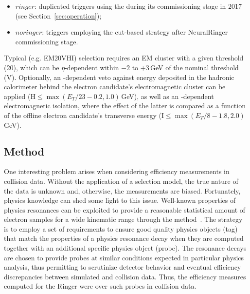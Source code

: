 \begin{itemize}
\item $ringer$: duplicated triggers using the \rnn during its
  commissioning stage in 2017 (see Section~\ref{sec:operation});
\item $noringer$: triggers employing the cut-based strategy after NeuralRinger
  commissioning stage.
\end{itemize}


Typical \licalo (e.g. EM20VHI) selection requires an EM cluster with a
given threshold (20), which can be  $\eta$-dependent within $-2$ to $+3\,$GeV
of the nominal threshold (V). Optionally, an \et-dependent veto against energy
deposited in the hadronic calorimeter behind the electron candidate's
electromagnetic cluster can be applied (H$\le \max(E_T/23-0.2, 1.0)\,$GeV), as
well as an \et-dependent electromagnetic isolation, where the effect of the
latter is compared as a function of the offline electron candidate's transverse
energy (I$\le \max(E_T/8-1.8, 2.0)\,$GeV).



\subsection{\TnP Method}\label{ssec:tnp}

One interesting problem arises when considering efficiency measurements in collision data. Without the application of a selection model, the true nature of the data is unknown and, otherwise, the measurements are biased. Fortunately, physics knowledge can shed some light to this issue. Well-known properties of physics resonances can be exploited to provide a reasonable statistical amount of electron samples for a wide kinematic range through the \tnp{} method~\cite{PERF-2016-01}. The strategy is to employ a set of requirements to ensure good quality physics objects (tag) that match the properties of a physics resonance decay when they are computed together with an additional specific physics object (probe). The resonance decays are chosen to provide probes at similar conditions expected in particular physics analysis, thus permitting to scrutinize detector behavior and eventual efficiency discrepancies between simulated and collision data. Thus, the efficiency measures computed for the Ringer were over such probes in collision data.


